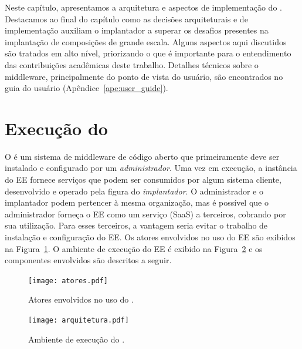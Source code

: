 Neste capítulo, apresentamos a arquitetura e aspectos de implementação do \ee.   
Destacamos ao final do capítulo
como as decisões arquiteturais e de implementação auxiliam o implantador
a superar os desafios presentes na implantação de composições de grande escala.
Alguns aspectos aqui discutidos são tratados em alto nível,
priorizando o que é importante para o entendimento das contribuições
acadêmicas deste trabalho.
Detalhes técnicos sobre o middleware, principalmente do ponto de vista do
usuário, são encontrados no guia do usuário (Apêndice~\ref{ape:user_guide}).

\section{Execução do \ee}

O \ee é um sistema de middleware de código aberto que primeiramente deve ser instalado e configurado por um \emph{administrador}.
Uma vez em execução, a instância do EE fornece serviços que podem ser consumidos por algum sistema cliente, desenvolvido
e operado pela figura do \emph{implantador}. O administrador e o implantador podem pertencer à mesma organização,
mas é possível que o administrador forneça o EE como um serviço (SaaS) a terceiros, cobrando por sua utilização.
Para esses terceiros, a vantagem seria evitar o trabalho de instalação e configuração do EE.
Os atores envolvidos no uso do EE são exibidos na Figura~\ref{fig:atores}. 
O ambiente de execução do EE é exibido na Figura~\ref{fig:arquitetura} 
e os componentes envolvidos são descritos a seguir.

\begin{figure}[h]
\centering
\texttt{[image: atores.pdf]}
\caption{Atores envolvidos no uso do \ee.}
\label{fig:atores}
\end{figure}

\begin{figure}[h]
\centering
\texttt{[image: arquitetura.pdf]}
\caption{Ambiente de execução do \choreos \ee.}
\label{fig:arquitetura}
\end{figure}


